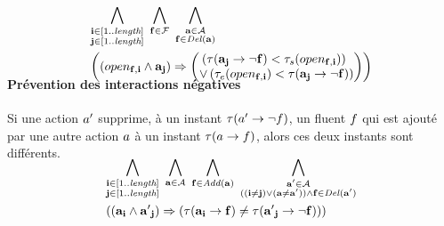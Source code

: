 \begin{small}
\begin{multline*}
~\\[-3em]
\bigwedge\limits_{\substack{\mathbf{i}\in [1..\mathbf{\length}]\\ \mathbf{j}\in [1..\mathbf{\length}]}}%
~\bigwedge\limits_{\substack{\mathbf{\f}\in \mathbf{\F}}}~\bigwedge\limits_{\substack{\mathbf{\a}\in \mathbf{\A}\\\mathbf{\f} \in \del{\mathbf{\a}}}}\hfill\\
\left(\left(open_{\mathbf{\f},\mathbf{i}} \wedge \mathbf{\a}_{\mathbf{j}}\right) \Rightarrow \begin{pmatrix}\left(\tau(\mathbf{\a}_\mathbf{j}\rightarrow \neg \mathbf{\f}) < \tau_{s}(open_{\mathbf{\f},\mathbf{i}})\right)\hfill\\
 \vee \left(\tau_{e}(open_{\mathbf{\f},\mathbf{i}}) < \tau(\mathbf{\a}_\mathbf{j}\rightarrow \neg \mathbf{\f})\right)\end{pmatrix}\right)\hfill\\[-2em]
\end{multline*}
\end{small}


\paragraph*{Prévention des interactions négatives}

Si une action $a'$ supprime, à un instant $\tau(a'\rightarrow\neg f)$, un fluent $f$ qui est ajouté par une autre action $a$ à un instant $\tau(a\rightarrow f)$, alors ces deux instants sont différents.

\begin{small}
\begin{multline*}
~\\[-3em]
\bigwedge\limits_{\substack{\mathbf{i}\in [1..\mathbf{\length}]\\ \mathbf{j}\in [1..\mathbf{\length}]}}%
~\bigwedge\limits_{\substack{\mathbf{\a}\in \mathbf{\A}}}~\bigwedge\limits_{\substack{\mathbf{\f}\in \add{\mathbf{\a}}}}~\bigwedge\limits_{\substack{\mathbf{\b}\in \mathbf{\A}\\((\mathbf{i} \neq \mathbf{j}) \vee (\mathbf{\a} \neq \mathbf{\b})) \wedge \mathbf{\f} \in \del{\mathbf{\b}}}}\hfill\\
\left(\left(\mathbf{\a}_{\mathbf{i}} \wedge \mathbf{\b}_{\mathbf{j}}\right) \Rightarrow %
\left(\tau(\mathbf{\a}_\mathbf{i}\rightarrow \mathbf{\f}) \neq \tau(\mathbf{\b}_\mathbf{j}\rightarrow \neg \mathbf{\f})\right)\hfill%
\right)\hfill\\[-2em]
\end{multline*}
\end{small}


